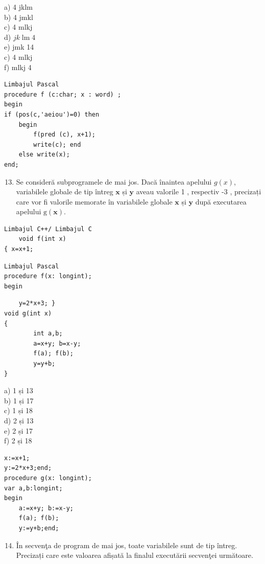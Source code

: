 \documentclass[10pt]{article}
\begin{document}
a) 4 jklm\\
b) 4 jmkl\\
c) 4 mlkj\\
d) $j k \operatorname{lm} 4$\\
e) jmk 14\\
c) 4 mlkj\\
f) mlkj 4

\begin{verbatim}
Limbajul Pascal
procedure f (c:char; x : word) ;
begin
if (pos(c,'aeiou')=0) then
    begin
        f(pred (c), x+1);
        write(c); end
    else write(x);
end;
\end{verbatim}

\begin{enumerate}
  \setcounter{enumi}{12}
  \item Se consideră subprogramele de mai jos. Dacă înaintea apelului $g(x)$, variabilele globale de tip întreg $\mathbf{x}$ și $\mathbf{y}$ aveau valorile 1 , respectiv -3 , precizați care vor fi valorile memorate în variabilele globale $\mathbf{x}$ și $\mathbf{y}$ după executarea apelului $\mathrm{g}(\mathbf{x})$.
\end{enumerate}

\begin{verbatim}
Limbajul C++/ Limbajul C
    void f(int x)
{ x=x+1;
\end{verbatim}

\begin{verbatim}
Limbajul Pascal
procedure f(x: longint);
begin
\end{verbatim}

\begin{verbatim}
    y=2*x+3; }
void g(int x)
{
        int a,b;
        a=x+y; b=x-y;
        f(a); f(b);
        y=y+b;
}
\end{verbatim}

a) 1 și 13\\
b) 1 și 17\\
c) 1 și 18\\
d) 2 și 13\\
e) 2 și 17\\
f) 2 și 18

\begin{verbatim}
x:=x+1;
y:=2*x+3;end;
procedure g(x: longint);
var a,b:longint;
begin
    a:=x+y; b:=x-y;
    f(a); f(b);
    y:=y+b;end;
\end{verbatim}

\begin{enumerate}
  \setcounter{enumi}{13}
  \item În secvenţa de program de mai jos, toate variabilele sunt de tip întreg. Precizați care este valoarea afișată la finalul executării secvenţei următoare.
\end{enumerate}
\end{document}
